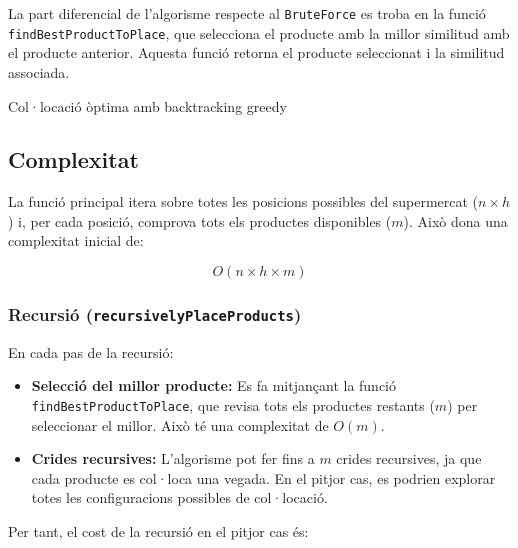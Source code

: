 \documentclass[a4paper,12pt]{report}
\begin{document}
La part diferencial de l'algorisme respecte al \texttt{BruteForce} es troba en la funció \texttt{findBestProductToPlace}, que selecciona el producte amb la millor similitud amb el producte anterior. 
Aquesta funció retorna el producte seleccionat i la similitud associada.
\newline
\begin{algorithm}[H]
	\SetAlgoVlined
	\caption{Col·locació òptima amb backtracking greedy}
\end{algorithm}

\subsection{Complexitat}

La funció principal itera sobre totes les posicions possibles del supermercat (\(n \times h\)) i, per cada posició, comprova tots els productes disponibles (\(m\)). Això dona una complexitat inicial de:

\[
O(n \times h \times m)
\]

\subsubsection{Recursió (\texttt{recursivelyPlaceProducts})}

En cada pas de la recursió:
\begin{itemize}
    \item \textbf{Selecció del millor producte:} Es fa mitjançant la funció \texttt{findBestProductToPlace}, que revisa tots els productes restants (\(m\)) per seleccionar el millor. Això té una complexitat de \(O(m)\).
    \item \textbf{Crides recursives:} L'algorisme pot fer fins a \(m\) crides recursives, ja que cada producte es col·loca una vegada. En el pitjor cas, es podrien explorar totes les configuracions possibles de col·locació.
\end{itemize}

Per tant, el cost de la recursió en el pitjor cas és:
\end{document}

